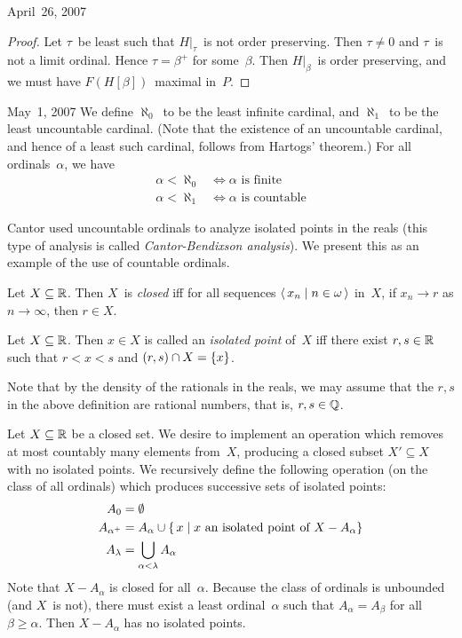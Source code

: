 \begin{lecture}{April~26, 2007}
\begin{proof}
Let \(\tau\)~be least such that \(H|_{\tau}\)~is not order preserving. Then \(\tau\ne0\) and \(\tau\)~is not a limit ordinal. Hence \(\tau=\beta^+\) for some~\(\beta\). Then \(H|_{\beta}\)~is order preserving, and we must have \(F(H[\beta])\)~maximal in~\(P\).
\end{proof}
\end{lecture}

\begin{lecture}{May~1, 2007}
We define \(\aleph_0\)~to be the least infinite cardinal, and \(\aleph_1\)~to be the least uncountable cardinal. (Note that the existence of an uncountable cardinal, and hence of a least such cardinal, follows from Hartogs' theorem.) For all ordinals~\(\alpha\), we have
\begin{align*}
\alpha<\aleph_0&\iff \alpha\text{ is finite}\\
\alpha<\aleph_1&\iff \alpha\text{ is countable}
\end{align*}

Cantor used uncountable ordinals to analyze isolated points in the reals (this type of analysis is called \emph{Cantor-Bendixson analysis}). We present this as an example of the use of countable ordinals.
\begin{defn}
Let \(X\subseteq\mathbb{R}\). Then \(X\)~is \emph{closed} iff for all sequences \(\langle\,{x_n}\mid{n\in\omega}\,\rangle\) in~\(X\), if \(x_n\to r\) as \(n\to\infty\), then \(r\in X\).
\end{defn}
\begin{defn}
Let \(X\subseteq\mathbb{R}\). Then \(x\in X\) is called an \emph{isolated point} of~\(X\) iff there exist \(r,s\in\mathbb{R}\) such that \(r<x<s\) and \((r,s)\cap X=\{x\}\).
\end{defn}
\noindent Note that by the density of the rationals in the reals, we may assume that the \(r,s\) in the above definition are rational numbers, that is, \(r,s\in\mathbb{Q}\).

Let \(X\subseteq\mathbb{R}\) be a closed set. We desire to implement an operation which removes at most countably many elements from~\(X\), producing a closed subset \(X'\subseteq X\) with no isolated points. We recursively define the following operation (on the class of all ordinals) which produces successive sets of isolated points:
\begin{align*}
A_0&=\emptyset\\
A_{\alpha^+}&=A_{\alpha}\cup\{\,x\mid x\text{ an isolated point of }X-A_{\alpha}\}\\
A_{\lambda}&=\bigcup_{\alpha<\lambda}A_{\alpha}
\end{align*}
Note that \(X-A_{\alpha}\) is closed for all~\(\alpha\). Because the class of ordinals is unbounded (and \(X\)~is not), there must exist a least ordinal~\(\alpha\) such that \(A_{\alpha}=A_{\beta}\) for all \(\beta\ge\alpha\). Then \(X-A_{\alpha}\) has no isolated points.


\end{lecture}
